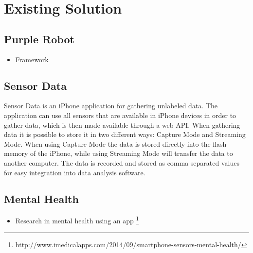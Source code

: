 
\section{Existing Solution}
\label{sec:existing_solution}


\subsection{Purple Robot}
\label{sub:purple_robot}

\begin{itemize}
	\item Framework
\end{itemize}

\subsection{Sensor Data} 
\label{sub:sensor_data}

Sensor Data is an iPhone application for gathering unlabeled data. The application can use all sensors that are available in iPhone devices in order to gather data, which is then made available through a web API. When gathering data it is possible to store it in two different ways: Capture Mode and Streaming Mode. When using Capture Mode the data is stored directly into the flash memory of the iPhone, while using Streaming Mode will transfer the data to another computer. The data is recorded and stored as comma separated values for easy integration into data analysis software.


\subsection{Mental Health} %
\label{sub:mental_health}

\begin{itemize}
    \item Research in mental health using an app \footnote{http://www.imedicalapps.com/2014/09/smartphone-sensors-mental-health/}
\end{itemize}





